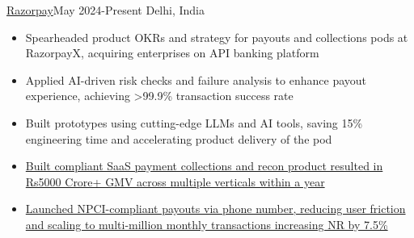\documentclass[10pt,a4paper,ragged2e]{altacv}
\begin{document}
 {\color{mecol}\href{https://razorpay.com/x/}{Razorpay}}{May 2024-Present }{Delhi, India}
\begin{itemize}


\item {Spearheaded product OKRs and strategy for payouts and collections pods at RazorpayX, acquiring enterprises on API banking platform}
\item {Applied AI-driven risk checks and failure analysis to enhance payout experience, achieving >99.9\% transaction success rate}
\item {Built prototypes using cutting-edge LLMs and AI tools, saving 15\% engineering time and accelerating product delivery of the pod}
\item {\href{https://razorpay.com/blog/razorpayx-smart-collect-2-0-instant-collections-automated-reconciliation-redefine-your-bank-transfers/}{Built compliant SaaS payment collections and recon product resulted in Rs5000 Crore+ GMV across multiple verticals within a year}}
\item {\href{https://razorpay.com/blog/razorpayx-launches-directtophone-payouts-transfer-money-instantly-with-just-a-phone-number/}{Launched NPCI-compliant payouts via phone number, reducing user friction and scaling to multi-million monthly transactions increasing NR by 7.5\%}}

\end{itemize}
\divider
\end{document}
